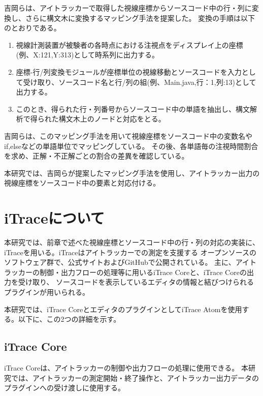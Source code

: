 \documentclass[paper=a4paper,fontsize=11pt]{jlreq}
\begin{document}
    吉岡らは、アイトラッカーで取得した視線座標からソースコード中の行・列に変換し、さらに構文木に変換するマッピング手法を提案した\cite{meiji2021}。
    変換の手順は以下のとおりである。
    \begin{enumerate}
      \item 視線計測装置が被験者の各時点における注視点をディスプレイ上の座標(例、X:121,Y:313)として時系列に出力する。
      \item 座標-行/列変換モジュールが座標単位の視線移動とソースコードを入力として受け取り、ソースコード名と行/列の組(例、Main.java,行：1,列:13)として出力する。
      \item このとき、得られた行・列番号からソースコード中の単語を抽出し、構文解析で得られた構文木上のノードと対応をとる。
    \end{enumerate}
    
    吉岡らは、このマッピング手法を用いて視線座標をソースコード中の変数名やif,elseなどの単語単位でマッピングしている。
    その後、各単語毎の注視時間割合を求め、正解・不正解ごとの割合の差異を確認している。

    本研究では、吉岡らが提案したマッピング手法を使用し、アイトラッカー出力の視線座標をソースコード中の要素と対応付ける。
  \clearpage    

  \section{iTraceについて}
    本研究では、前章で述べた視線座標とソースコード中の行・列の対応の実装に、iTrace\cite{itrace}を用いる。iTraceはアイトラッカーでの測定を支援する
    オープンソースのソフトウェア群で、公式サイトおよびGitHubで公開されている。
    主に、アイトラッカーの制御・出力フローの処理等に用いるiTrace Coreと、iTrace Coreの出力を受け取り、
    ソースコードを表示しているエディタの情報と結びつけられるプラグインが用いられる。

    本研究では、iTrace CoreとエディタのプラグインとしてiTrace Atomを使用する。以下に、この2つの詳細を示す。

    \subsection{iTrace Core}
      iTrace Coreは、アイトラッカーの制御や出力フローの処理に使用できる。
      本研究では、アイトラッカーの測定開始・終了操作と、アイトラッカー出力データのプラグインへの受け渡しに使用する。
\end{document}
